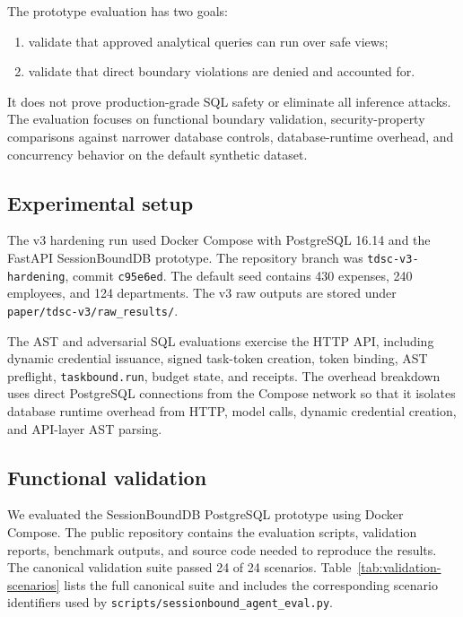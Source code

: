 \documentclass[journal]{IEEEtran}
\providecommand{\tightlist}{%
  \setlength{\itemsep}{0pt}\setlength{\parskip}{0pt}}
\begin{document}
The prototype evaluation has two goals:

\begin{enumerate}
\def\labelenumi{\arabic{enumi}.}
\tightlist
\item
  validate that approved analytical queries can run over safe views;
\item
  validate that direct boundary violations are denied and accounted for.
\end{enumerate}

It does not prove production-grade SQL safety or eliminate all inference
attacks. The evaluation focuses on functional boundary validation,
security-property comparisons against narrower database controls,
database-runtime overhead, and concurrency behavior on the default
synthetic dataset.

\hypertarget{experimental-setup}{%
\subsection{Experimental setup}\label{experimental-setup}}

The v3 hardening run used Docker Compose with PostgreSQL 16.14 and the
FastAPI SessionBoundDB prototype. The repository branch was
\texttt{tdsc-v3-hardening}, commit \texttt{c95e6ed}. The default seed
contains 430 expenses, 240 employees, and 124 departments. The v3 raw
outputs are stored under \texttt{paper/tdsc-v3/raw\_results/}.

The AST and adversarial SQL evaluations exercise the HTTP API, including
dynamic credential issuance, signed task-token creation, token binding,
AST preflight, \texttt{taskbound.run}, budget state, and receipts. The
overhead breakdown uses direct PostgreSQL connections from the Compose
network so that it isolates database runtime overhead from HTTP, model
calls, dynamic credential creation, and API-layer AST parsing.

\hypertarget{functional-validation}{%
\subsection{Functional validation}\label{functional-validation}}

We evaluated the SessionBoundDB PostgreSQL prototype using Docker
Compose. The public repository contains the evaluation scripts,
validation reports, benchmark outputs, and source code needed to
reproduce the results. The canonical validation suite passed 24 of 24
scenarios. Table~\ref{tab:validation-scenarios} lists the full canonical
suite and includes the corresponding scenario identifiers used by
\texttt{scripts/sessionbound\_agent\_eval.py}.
\end{document}
